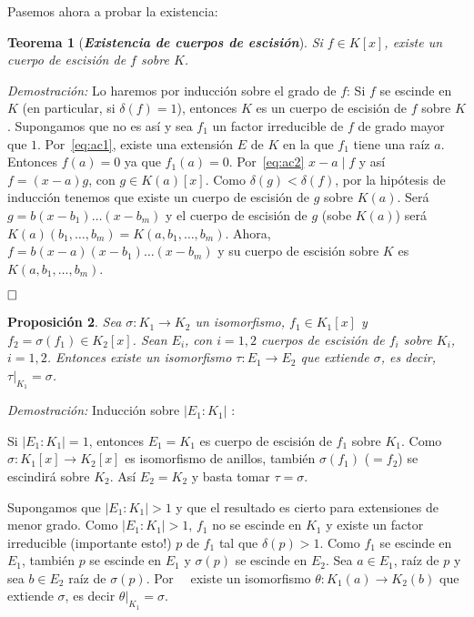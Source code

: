 \documentclass[12pt]{article}
\newtheorem{theorem}{Teorema}[section]
\newtheorem{proposition}[theorem]{Proposición}
\begin{document}
Pasemos ahora a probar la existencia:
\begin{theorem}[\textbf{\textit{Existencia de cuerpos de escisión}}]Si $f \in K[x]$, existe un cuerpo de escisión de $f$ sobre $K$.
\end{theorem}
\emph{Demostración: }Lo haremos por inducción sobre el grado de $f$:
Si $f$ se escinde en $K$ (en particular, si $\delta(f) = 1$), entonces $K$ es un cuerpo de escisión de $f$ sobre $K$. Supongamos que no es así y sea $f_{1}$ un factor irreducible de $f$ de grado mayor que $1$. Por~\ref{eq:ac1}, existe una extensión $E$ de $K$ en la que $f_{1}$ tiene una raíz $a$. Entonces $f(a) = 0$ ya que $f_{1}(a) = 0$. Por~\ref{eq:ac2} $x-a \mid f$ y así $f = (x-a)g$, con $g \in K(a)[x]$. Como $\delta (g) < \delta(f)$, por la hipótesis de inducción tenemos que existe un cuerpo de escisión de $g$ sobre $K(a)$. Será $g = b(x-b_{1}) \ldots (x-b_{m})$ y el cuerpo de escisión de $g$ (sobe $K(a)$) será $K(a)(b_{1}, \ldots, b_{m}) = K(a,b_{1}, \ldots, b_{m})$. Ahora, $f = b(x-a)(x-b_{1}) \ldots (x-b_{m})$ y su cuerpo de escisión sobre $K$ es $K(a, b_{1}, \ldots, b_{m})$.

$\hfill \square$

\begin{proposition}\label{eq:cuesc} Sea $\sigma \colon K_{1} \longrightarrow K_{2}$ un isomorfismo, $f_{1} \in K_{1}[x]$ y $f_{2} = \sigma (f_{1}) \in K_{2}[x]$. Sean $E_{i}$, con $i = 1,2$ cuerpos de escisión de $f_{i}$ sobre $K_{i}$, $i = 1,2$. Entonces existe un isomorfismo $\tau \colon E_{1} \longrightarrow E_{2}$ que extiende $\sigma$, es decir, $ \left.\tau \right|_{K_{1}} = \sigma$.
\end{proposition}
\emph{Demostración: } Inducción sobre $|E_{1}: K_{1}|$ :

Si $|E_{1}:K_{1}| = 1$, entonces $E_{1} = K_{1}$ es cuerpo de escisión de $f_{1}$ sobre $K_{1}$. Como $\sigma \colon K_{1}[x] \longrightarrow K_{2}[x]$ es isomorfismo de anillos, también $\sigma (f_{1})$ ($=f_{2}$) se escindirá sobre $K_{2}$. Así $E_{2} = K_{2}$ y basta tomar $\tau = \sigma$.

Supongamos que $|E_{1}: K_{1}| > 1$ y que el resultado es cierto para extensiones de menor grado. Como $|E_{1}:K_{1}| > 1$, $f_{1}$ no se escinde en $K_{1}$ y existe un factor irreducible (importante esto!) $p$ de $f_{1}$ tal que $\delta (p) > 1$. Como $f_{1}$ se escinde en $E_{1}$, también $p$ se escinde en $E_{1}$ y $\sigma (p)$ se escinde en $E_{2}$. Sea $a \in E_{1}$, raíz de $p$ y sea $b \in E_{2}$ raíz de $\sigma (p)$. Por~~ existe un isomorfismo $\theta	 \colon K_{1}(a) \longrightarrow K_{2}(b)$ que extiende $\sigma$, es decir $\left.\theta \right|_{K_{1}} = \sigma$.
\end{document}
